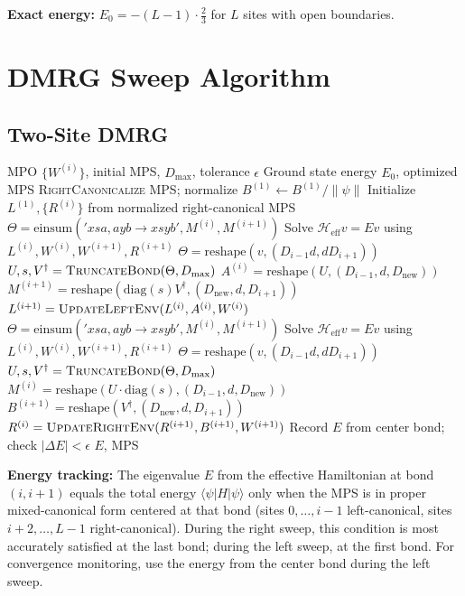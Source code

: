 \documentclass[aps,prb,onecolumn,scriptaddress]{revtex4-2}
\newcommand{\eps}{\epsilon}
\begin{document}
\textbf{Exact energy:} $E_0 = -(L-1) \cdot \frac{2}{3}$ for $L$ sites with open boundaries.

\section{DMRG Sweep Algorithm}

\subsection{Two-Site DMRG}

\begin{algorithm}[H]
\caption{TwoSiteDMRG}
\begin{algorithmic}[1]
\Require MPO $\{W^{(i)}\}$, initial MPS, $D_{\max}$, tolerance $\eps$
\Ensure Ground state energy $E_0$, optimized MPS
\State \textsc{RightCanonicalize} MPS; normalize $B^{(1)} \leftarrow B^{(1)}/\|\psi\|$
\State Initialize $L^{(1)}, \{R^{(i)}\}$ from normalized right-canonical MPS
\State {}
\State $\Theta = \text{einsum}('xsa,ayb \to xsyb', M^{(i)}, M^{(i+1)})$
\State Solve $\mathcal{H}_{\text{eff}} v = E v$ using $L^{(i)}, W^{(i)}, W^{(i+1)}, R^{(i+1)}$
\State $\Theta = \text{reshape}(v, (D_{i-1} d, d D_{i+1}))$
\State $U, s, V^\dagger = \textsc{TruncateBond}(\Theta, D_{\max})$
\State $A^{(i)} = \text{reshape}(U, (D_{i-1}, d, D_{\text{new}}))$ 
\State $M^{(i+1)} = \text{reshape}(\text{diag}(s) V^\dagger, (D_{\text{new}}, d, D_{i+1}))$
\State $L^{(i+1)} = \textsc{UpdateLeftEnv}(L^{(i)}, A^{(i)}, W^{(i)})$
\EndFor
\State {}
\State $\Theta = \text{einsum}('xsa,ayb \to xsyb', M^{(i)}, M^{(i+1)})$
\State Solve $\mathcal{H}_{\text{eff}} v = E v$ using $L^{(i)}, W^{(i)}, W^{(i+1)}, R^{(i+1)}$
\State $\Theta = \text{reshape}(v, (D_{i-1} d, d D_{i+1}))$
\State $U, s, V^\dagger = \textsc{TruncateBond}(\Theta, D_{\max})$
\State $M^{(i)} = \text{reshape}(U \cdot \text{diag}(s), (D_{i-1}, d, D_{\text{new}}))$
\State $B^{(i+1)} = \text{reshape}(V^\dagger, (D_{\text{new}}, d, D_{i+1}))$ 
\State $R^{(i)} = \textsc{UpdateRightEnv}(R^{(i+1)}, B^{(i+1)}, W^{(i+1)})$
\EndFor
\State Record $E$ from center bond; check $|\Delta E| < \eps$
\EndWhile
\State \Return $E$, MPS
\end{algorithmic}
\end{algorithm}

\textbf{Energy tracking:} The eigenvalue $E$ from the effective Hamiltonian at bond $(i, i{+}1)$ equals the total energy $\langle\psi|H|\psi\rangle$ only when the MPS is in proper mixed-canonical form centered at that bond (sites $0,\ldots,i{-}1$ left-canonical, sites $i{+}2,\ldots,L{-}1$ right-canonical). During the right sweep, this condition is most accurately satisfied at the last bond; during the left sweep, at the first bond. For convergence monitoring, use the energy from the center bond during the left sweep.
\end{document}
